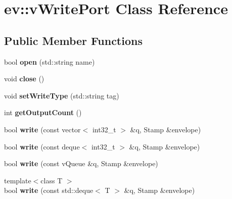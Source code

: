 \hypertarget{classev_1_1vWritePort}{}\section{ev\+:\+:v\+Write\+Port Class Reference}
\label{classev_1_1vWritePort}
\subsection*{Public Member Functions}
\begin{DoxyCompactItemize}
\item 
\mbox{\label{classev_1_1vWritePort_a2ae9d0799444e6b08a2741632ca2a844}} 
bool {\bfseries open} (std\+::string name)
\item 
\mbox{\label{classev_1_1vWritePort_a8657bd358f9714f5c183ba3038f1e672}} 
void {\bfseries close} ()
\item 
\mbox{\label{classev_1_1vWritePort_aaf5570455ab1a10e33005ea195f01212}} 
void {\bfseries set\+Write\+Type} (std\+::string tag)
\item 
\mbox{\label{classev_1_1vWritePort_a82bdfad9b345a33f3458c82c65e62305}} 
int {\bfseries get\+Output\+Count} ()
\item 
\mbox{\label{classev_1_1vWritePort_a30e8556f5ab495ec11cb5f595d0fc679}} 
bool {\bfseries write} (const vector$<$ int32\+\_\+t $>$ \&q, Stamp \&envelope)
\item 
\mbox{\label{classev_1_1vWritePort_ae90dc683d47992ea2374237c130f057b}} 
bool {\bfseries write} (const deque$<$ int32\+\_\+t $>$ \&q, Stamp \&envelope)
\item 
\mbox{\label{classev_1_1vWritePort_aa3a656f3748b036cf2a632d9591c13f3}} 
bool {\bfseries write} (const v\+Queue \&q, Stamp \&envelope)
\item 
\mbox{\label{classev_1_1vWritePort_a4accfe5230b426f9b863e481d8fb3c6c}} 
{\footnotesize template$<$class T $>$ }\\bool {\bfseries write} (const std\+::deque$<$ T $>$ \&q, Stamp \&envelope)
\end{DoxyCompactItemize}
